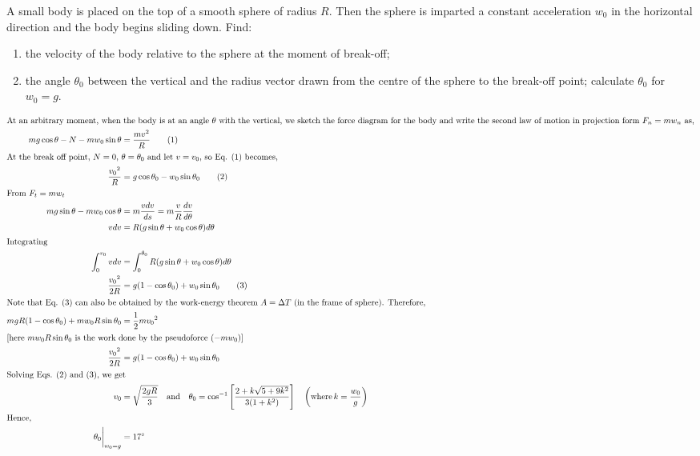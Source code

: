 \item A small body is placed on the top of a smooth sphere of radius $R$. Then the sphere is imparted a constant acceleration $w_0$ in the horizontal direction and the body begins sliding down. Find:
    \begin{enumerate}
        \item the velocity of the body relative to the sphere at the moment of break-off;
        \item the angle $\theta_0$ between the vertical and the radius vector drawn from the centre of the sphere to the break-off point; calculate $\theta_0$ for $w_0 = g$.
    \end{enumerate}\begin{solution}
    \begin{center}
    \end{center}
    
    \begin{align*}
        \intertext{At an arbitrary moment, when the body is at an angle \(\theta\) with the vertical, we sketch the force diagram for the body and write the second law of motion in projection form \(F_n = mw_n\) as,}
        mg \cos \theta - N - mw_0 \sin \theta &= \frac{mv^2}{R} \tag{1}\\
        \intertext{At the break off point, \(N = 0\), \(\theta = \theta_0\) and let \(v = v_0\), so Eq. (1) becomes,}
        \frac{{v_0}^2}{R} &= g \cos \theta_0 - w_0 \sin \theta_0 \tag{2}\\
        \intertext{From \(F_t = mw_t\)}
        mg \sin \theta - mw_0 \cos \theta &= m\frac{vdv}{ds} = m\frac{v}{R} \frac{dv}{d\theta}\\
        v dv &= R (g \sin \theta + w_0 \cos \theta) d \theta\\
        \intertext{Integrating}
        \int_{0}^{v_0} v dv &= \int_{0}^{\theta_0} R (g \sin \theta + w_0 \cos \theta) d\theta\\
        \frac{{v_0}^2}{2R} &= g (1 - \cos \theta_0) + w_0 \sin \theta_0 \tag{3}\\
        \intertext{Note that Eq. (3) can also be obtained by the work-energy theorem \(A = \Delta T\) (in the frame of sphere). Therefore,}
        mgR(1 - \cos \theta_0) + mw_0 R \sin \theta_0 &= \frac{1}{2} m {v_0}^2\\
        \intertext{[here \(mw_0 R \sin \theta_0\) is the work done by the pseudoforce (\(-mw_0\))]}
        \frac{{v_0}^2}{2R} &= g (1 - \cos \theta_0) + w_0 \sin \theta_0\\
        \intertext{Solving Eqs. (2) and (3), we get}
        v_0 &= \sqrt{\frac{2gR}{3}} \quad \text{and} \quad \theta_0 = \cos^{-1} \left[ \frac{2 + k \sqrt{5 + 9k^2}}{3(1 + k^2)} \right] \quad  \left(\text{where} \, k = \frac{w_0}{g}\right)\\
        \intertext{Hence,}
        \theta_0 \biggr|_{w_0 = g} &= 17^\circ
    \end{align*}
\end{solution}